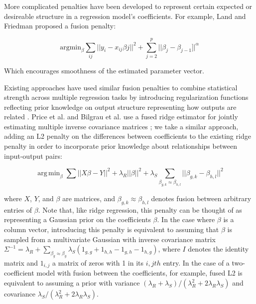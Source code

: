 \documentclass[11pt]{article}
\DeclareMathOperator*{\argmin}{arg\,min}
\begin{document}
More complicated penalties have been developed to represent certain expected or desireable structure in a regression model's coefficients. For example, Land and Friedman \cite{citeulike3780356} proposed a fusion penalty:

\begin{equation}
\text{argmin}_{\beta} \displaystyle\sum_{ij} || y_i - x_{ij}\beta{j} ||^2 + \sum\limits_{j=2}^p ||\beta_j - \beta_{j-1}]|^\alpha
\end{equation}

Which encourages smoothness of the estimated parameter vector. 

Existing approaches have used similar fusion penalties to combine statistical strength across multiple regression tasks by introducing regularization functions reflecting prior knowledge on output structure representing how outputs are related \cite{kim_tree-guided_2012,Land1997,Chen2010,Petry2011,Hebiri2011}. Price et al. and Bilgrau et al. use a fused ridge estimator for jointly estimating multiple inverse covariance matrices \cite{Price2014a,Bilgrau2015}; we take a similar approach, adding an L2 penalty on the differences between coefficients to the existing ridge penalty in order to incorporate prior knowledge about relationships between input-output pairs:


\begin{equation}
\argmin_{\beta} \displaystyle\sum \vert \vert X\beta - Y \vert \vert ^2 + \lambda_R \vert \vert \beta \vert \vert ^2 +  \lambda_S  \displaystyle \sum_{\beta_{g,k} \approx \beta_{h,l}} || \beta_{g,k} - \beta_{h,l} ||^2
\label{eqn:main}
\end{equation}

where $X$, $Y$, and $\beta$ are matrices, and $\beta_{g,k} \approx \beta_{h,l}$ denotes fusion between arbitrary entries of $\beta$. Note that, like ridge regression, this penalty can be thought of as representing a Gaussian prior on the coefficients $\beta$. In the case where $\beta$ is a column vector, introducing this penalty is equivalent to assuming that $\beta$ is sampled from a multivariate Gaussian with inverse covariance matrix $\Sigma^{-1} = \lambda_R + \displaystyle \sum_{\beta_g \approx \beta_g} \lambda_S (1_{g,g} + 1_{h,h} - 1_{g,h} - 1_{h,g})$, where $I$ denotes the identity matrix and $1_{i,j}$ a matrix of zeros with 1 in its $i, jth$ entry. In the case of a two-coefficient model with fusion between the coefficients, for example, fused L2 is equivalent to assuming a prior with variance $(\lambda_R + \lambda_S)/(\lambda_R^2+2\lambda_R\lambda_S)$ and covariance $\lambda_S/(\lambda_R^2+2\lambda_R\lambda_S)$.
\end{document}
